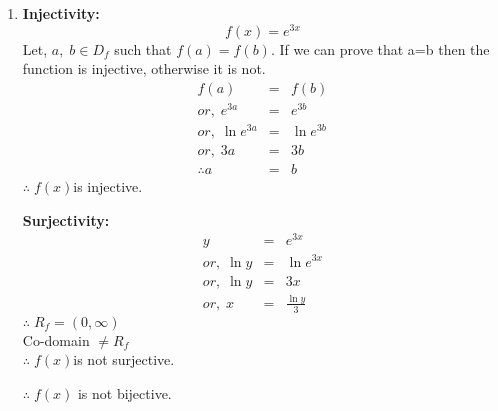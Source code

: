 \documentclass{article}
\begin{document}
\begin{enumerate}
\item{
\begin{minipage}[t]{0.4\linewidth}
\textbf{Injectivity:}
    $$f(x) = e^{3x}$$
Let, $a,\;b\in D_f$ such that $f(a) = f(b)$. If we can prove that a=b then the function is injective, otherwise it is not.
\begin{eqnarray*}
    f(a) &=& f(b)\\
    or,\;e^{3a} &=& e^{3b}\\
    or,\;\ln{e^{3a}} &=& \ln{e^{3b}}\\
    or,\;3a&=&3b\\
    \therefore a&=&b
\end{eqnarray*}
$\therefore\;f(x)$is injective.
\end{minipage}\hfill
\begin{minipage}[t]{0.4\linewidth}
\textbf{Surjectivity:}
\begin{eqnarray*}
    y&=&e^{3x}\\
    or,\;\ln{y} &=& \ln{e^{3x}}\\
    or,\;\ln{y} &=& 3x\\
    or,\;x &=& \frac{\ln{y}}{3}
\end{eqnarray*}
    $\therefore\;R_f=(0,\infty)$\\ 
Co-domain $\ne R_f$\\
    $\therefore\;f(x)$is not surjective.
\end{minipage}

\vspace{1cm}
\begin{center}
$\therefore\;f(x)$ is not bijective.
\end{center}
\vspace{1cm}
}
\end{enumerate}
\end{document}
